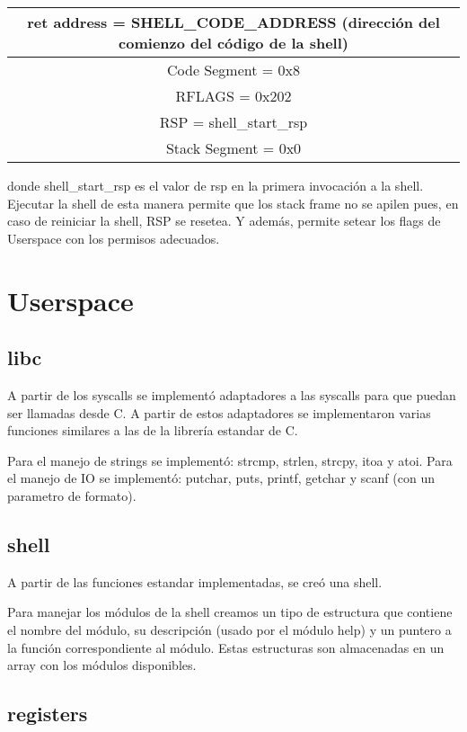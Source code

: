 \documentclass{article}
\begin{document}
\begin{center}
\begin{tabular}{|c|}
\hline
ret address = SHELL\_CODE\_ADDRESS (dirección del comienzo del código de la shell) \\ \hline
Code Segment = 0x8 \\ \hline
RFLAGS = 0x202 \\ \hline
RSP = shell\_start\_rsp \\ \hline
Stack Segment = 0x0 \\ \hline
\end{tabular}
\end{center}
donde shell\_start\_rsp es el valor de rsp en la primera invocación a la shell. Ejecutar la shell de esta manera permite que los stack frame no se apilen pues, en caso de reiniciar la shell, RSP se resetea. Y además, permite setear los flags de Userspace con los permisos adecuados.

\section {Userspace}

\subsection {libc}

A partir de los syscalls se implementó adaptadores a las syscalls para que puedan ser llamadas desde C. A partir de estos adaptadores se implementaron varias funciones similares a las de la librería estandar de C.

Para el manejo de strings se implementó: strcmp, strlen, strcpy, itoa y atoi.
Para el manejo de IO se implementó: putchar, puts, printf, getchar y scanf (con un parametro de formato).

\subsection {shell}

A partir de las funciones estandar implementadas, se creó una shell. 

Para manejar los módulos de la shell creamos un tipo de estructura que contiene el nombre del módulo, su descripción (usado por el módulo help) y un puntero a la función correspondiente al módulo. Estas estructuras son almacenadas en un array con los módulos disponibles.

\subsection {registers}
\end{document}
